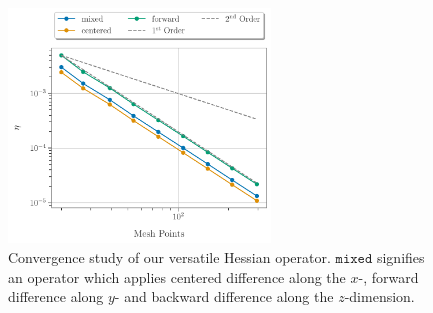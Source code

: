 \begin{figure}
    \begin{center}
        \includegraphics[width=0.62\textwidth]{figures/appendix/chainableOperator/customHessian_convergence.pdf}
    \end{center}
    \caption{Convergence study of our versatile Hessian operator. $\texttt{mixed}$
    signifies an operator which applies centered difference along the $x$-, forward
difference along $y$- and backward difference along the $z$-dimension.}
    \label{fig:customHessian_convergence}
\end{figure}




















